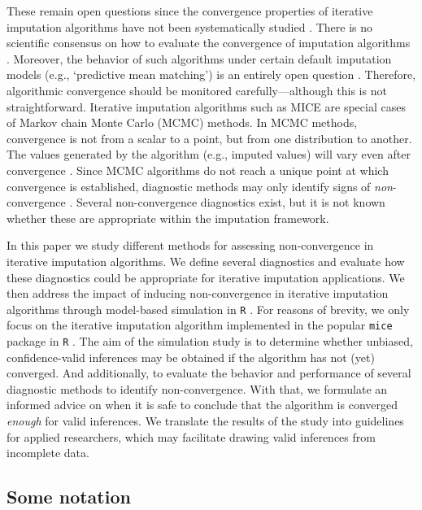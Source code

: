 \documentclass[Royal,times,sageh]{sagej}
\begin{document}
These remain open questions since the convergence properties of iterative imputation algorithms have not been systematically studied \citep{buur18}. There is no scientific consensus on how to evaluate the convergence of imputation algorithms \citep{zhu15, taka17}. Moreover, the behavior of such algorithms under certain default imputation models (e.g., `predictive mean matching') is an entirely open question \citep{murr18}. Therefore, algorithmic convergence should be monitored carefully---although this is not straightforward. Iterative imputation algorithms such as MICE are special cases of Markov chain Monte Carlo (MCMC) methods. In MCMC methods, convergence is not from a scalar to a point, but from one distribution to another. The values generated by the algorithm (e.g., imputed values) will vary even after convergence \citep{gelm13}. Since MCMC algorithms do not reach a unique point at which convergence is established, diagnostic methods may only identify signs of \emph{non}-convergence \citep{hoff09}. Several non-convergence diagnostics exist, but it is not known whether these are appropriate within the imputation framework.

In this paper we study different methods for assessing non-convergence in iterative imputation algorithms. We define several diagnostics and evaluate how these diagnostics could be appropriate for iterative imputation applications. We then address the impact of inducing non-convergence in iterative imputation algorithms through model-based simulation in \texttt{R} \citep{R}. For reasons of brevity, we only focus on the iterative imputation algorithm implemented in the popular \texttt{mice} package in \texttt{R} \citep{mice}. The aim of the simulation study is to determine whether unbiased, confidence-valid inferences may be obtained if the algorithm has not (yet) converged. And additionally, to evaluate the behavior and performance of several diagnostic methods to identify non-convergence. With that, we formulate an informed advice on when it is safe to conclude that the algorithm is converged \emph{enough} for valid inferences. We translate the results of the study into guidelines for applied researchers, which may facilitate drawing valid inferences from incomplete data.

\hypertarget{some-notation}{%
\subsection{Some notation}\label{some-notation}}
\end{document}
